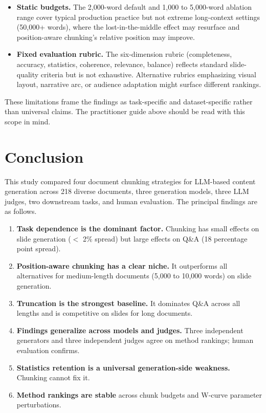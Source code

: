\documentclass{ieeeaccess}
\begin{document}
\begin{itemize}
    \item \textbf{Static budgets.} The 2,000-word default and 1,000 to 5,000-word ablation range cover typical production practice but not extreme long-context settings (50,000+ words), where the lost-in-the-middle effect may resurface and position-aware chunking's relative position may improve.
    \item \textbf{Fixed evaluation rubric.} The six-dimension rubric (completeness, accuracy, statistics, coherence, relevance, balance) reflects standard slide-quality criteria but is not exhaustive. Alternative rubrics emphasizing visual layout, narrative arc, or audience adaptation might surface different rankings.
\end{itemize}

These limitations frame the findings as task-specific and dataset-specific rather than universal claims. The practitioner guide above should be read with this scope in mind.

\section{Conclusion}
\label{sec:conclusion}

This study compared four document chunking strategies for LLM-based content generation across 218 diverse documents, three generation models, three LLM judges, two downstream tasks, and human evaluation. The principal findings are as follows.

\begin{enumerate}
    \item \textbf{Task dependence is the dominant factor.} Chunking has small effects on slide generation ($<$ 2\% spread) but large effects on Q\&A (18 percentage point spread).
    \item \textbf{Position-aware chunking has a clear niche.} It outperforms all alternatives for medium-length documents (5,000 to 10,000 words) on slide generation.
    \item \textbf{Truncation is the strongest baseline.} It dominates Q\&A across all lengths and is competitive on slides for long documents.
    \item \textbf{Findings generalize across models and judges.} Three independent generators and three independent judges agree on method rankings; human evaluation confirms.
    \item \textbf{Statistics retention is a universal generation-side weakness.} Chunking cannot fix it.
    \item \textbf{Method rankings are stable} across chunk budgets and W-curve parameter perturbations.
\end{enumerate}
\end{document}
